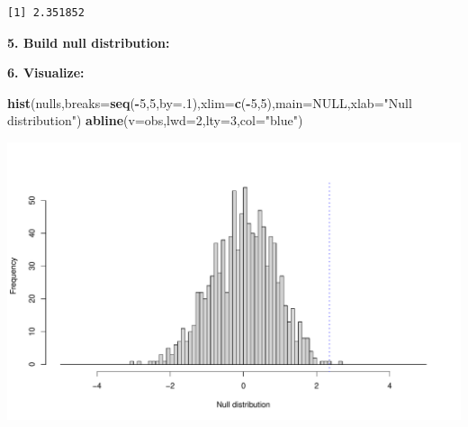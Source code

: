 \documentclass[
]{book}
\newenvironment{Shaded}{\begin{snugshade}}{\end{snugshade}}
\newcommand{\ControlFlowTok}[1]{\textcolor[rgb]{0.13,0.29,0.53}{\textbf{#1}}}
\newcommand{\DataTypeTok}[1]{\textcolor[rgb]{0.13,0.29,0.53}{#1}}
\newcommand{\DecValTok}[1]{\textcolor[rgb]{0.00,0.00,0.81}{#1}}
\newcommand{\KeywordTok}[1]{\textcolor[rgb]{0.13,0.29,0.53}{\textbf{#1}}}
\newcommand{\NormalTok}[1]{#1}
\newcommand{\OperatorTok}[1]{\textcolor[rgb]{0.81,0.36,0.00}{\textbf{#1}}}
\newcommand{\OtherTok}[1]{\textcolor[rgb]{0.56,0.35,0.01}{#1}}
\newcommand{\StringTok}[1]{\textcolor[rgb]{0.31,0.60,0.02}{#1}}
\begin{document}
\begin{verbatim}
[1] 2.351852
\end{verbatim}

\textbf{5. Build null distribution:}

\begin{Shaded}
\end{Shaded}

\textbf{6. Visualize:}

\begin{Shaded}
\begin{Highlighting}[]
\KeywordTok{hist}\NormalTok{(nulls,}\DataTypeTok{breaks=}\KeywordTok{seq}\NormalTok{(}\OperatorTok{-}\DecValTok{5}\NormalTok{,}\DecValTok{5}\NormalTok{,}\DataTypeTok{by=}\NormalTok{.}\DecValTok{1}\NormalTok{),}\DataTypeTok{xlim=}\KeywordTok{c}\NormalTok{(}\OperatorTok{-}\DecValTok{5}\NormalTok{,}\DecValTok{5}\NormalTok{),}\DataTypeTok{main=}\OtherTok{NULL}\NormalTok{,}\DataTypeTok{xlab=}\StringTok{"Null distribution"}\NormalTok{)}
\KeywordTok{abline}\NormalTok{(}\DataTypeTok{v=}\NormalTok{obs,}\DataTypeTok{lwd=}\DecValTok{2}\NormalTok{,}\DataTypeTok{lty=}\DecValTok{3}\NormalTok{,}\DataTypeTok{col=}\StringTok{"blue"}\NormalTok{)}
\end{Highlighting}
\end{Shaded}

\includegraphics{figures/unnamed-chunk-315-1.pdf}
\end{document}

